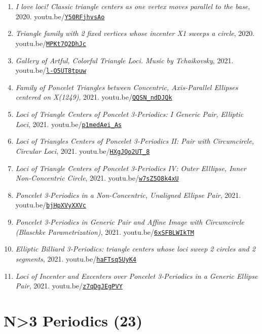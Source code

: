 \documentclass[12pt]{article}
\begin{document}
\begin{enumerate}[resume]
\item \textit{I love loci! Classic triangle centers as one vertex moves parallel to the base}, 2020. youtu.be/\href{https://youtu.be/Y50RFjhvsAo}{\nolinkurl{Y50RFjhvsAo}}
\item \textit{Triangle family with 2 fixed vertices whose incenter X1 sweeps a circle}, 2020. youtu.be/\href{https://youtu.be/MPKt7Q2DhJc}{\nolinkurl{MPKt7Q2DhJc}}
\item \textit{Gallery of Artful, Colorful Triangle Loci. Music by Tchaikovsky}, 2021. youtu.be/\href{https://youtu.be/l-O5UT8tpuw}{\nolinkurl{l-O5UT8tpuw}}
\item \textit{Family of Poncelet Triangles between Concentric, Axis-Parallel Ellipses centered on X(1249)}, 2021. youtu.be/\href{https://youtu.be/QQSN_ndDJQk}{\nolinkurl{QQSN\_ndDJQk}}
\item \textit{Loci of Triangle Centers of Poncelet 3-Periodics: 
I Generic Pair, Elliptic Loci}, 2021. youtu.be/\href{https://youtu.be/p1medAei_As}{\nolinkurl{p1medAei\_As}}
\item \textit{Loci of Triangles Centers of Poncelet 3-Periodics II: Pair with Circumcircle, Circular Loci}, 2021. youtu.be/\href{https://youtu.be/HXgJQo2UT_8}{\nolinkurl{HXgJQo2UT\_8}}
\item \textit{Loci of Triangle Centers of Poncelet 3-Periodics IV: Outer Elllipse, Inner Non-Concentric Circle}, 2021. youtu.be/\href{https://youtu.be/w7sZ5O8k4xU}{\nolinkurl{w7sZ5O8k4xU}}
\item \textit{Poncelet 3-Periodics in a Non-Concentric, Unaligned Ellipse Pair}, 2021. youtu.be/\href{https://youtu.be/bjHpXVyXXVc}{\nolinkurl{bjHpXVyXXVc}}
\item \textit{Poncelet 3-Periodics in Generic Pair and Affine Image with Circumcircle (Blaschke Parametrization)}, 2021. youtu.be/\href{https://youtu.be/6xSFBLWIkTM}{\nolinkurl{6xSFBLWIkTM}}
\item \textit{Elliptic Billiard 3-Periodics: triangle centers whose loci sweep 2 circles and 2 segments}, 2021. youtu.be/\href{https://youtu.be/haFTsq5UyK4}{\nolinkurl{haFTsq5UyK4}}
\item \textit{Loci of Incenter and Excenters over Poncelet 3-Periodics in a Generic Ellipse Pair}, 2021. youtu.be/\href{https://youtu.be/z7qDgJEgPVY}{\nolinkurl{z7qDgJEgPVY}}
\end{enumerate}

\section{N>3 Periodics (23)}
\end{document}
